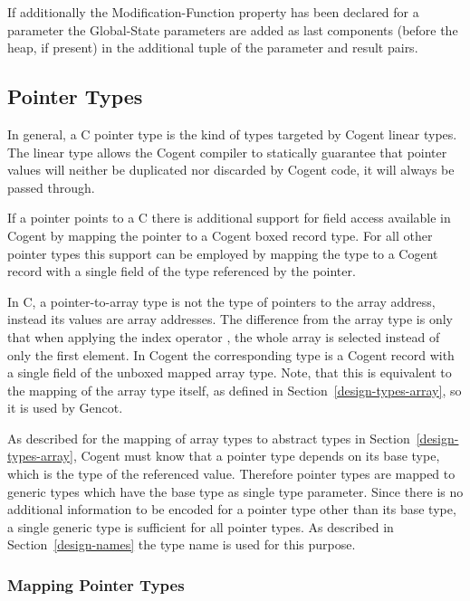 If additionally the Modification-Function property has been declared for a parameter the Global-State parameters are added 
as last components (before the heap, if present) in the additional tuple of the parameter and result pairs.

\subsection{Pointer Types}
\label{design-types-pointer}

In general, a C pointer type  is the kind of types targeted by Cogent linear types. The linear type 
allows the Cogent compiler to statically guarantee that pointer values will neither be duplicated nor 
discarded by Cogent code, it will always be passed through. 

If a pointer points to a C  there is additional support for field access available in Cogent by 
mapping the pointer to a Cogent boxed record type. For all other pointer types this support can be employed by
mapping the type to a Cogent record with a single field of the type referenced by the pointer.

In C, a pointer-to-array type is not the type of pointers to the array address, instead its values are array addresses.
The difference from the array type is only that when applying the index operator \code{[]}, the whole array is
selected instead of only the first element. In Cogent the corresponding type is a Cogent record with a single
field of the unboxed mapped array type. Note, that this is equivalent to the mapping of the array type itself, as defined
in Section~\ref{design-types-array}, so it is used by Gencot.

As described for the mapping of array types to abstract types in Section~\ref{design-types-array}, Cogent must know 
that a pointer type depends on 
its base type, which is the type of the referenced value. Therefore pointer types are mapped to generic types which
have the base type as single type parameter. Since there is no additional information to be encoded for a pointer
type other than its base type, a single generic type is sufficient for all pointer types. As described in 
Section~\ref{design-names} the type name  is used for this purpose.

\subsubsection{Mapping Pointer Types}

